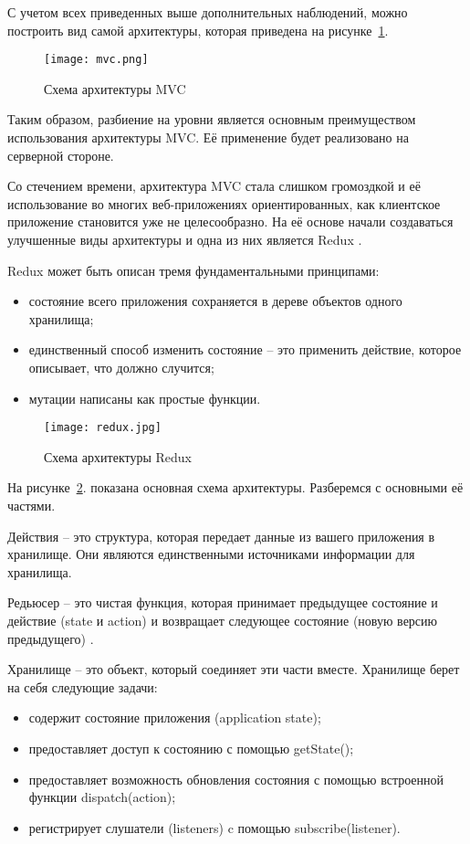 С учетом всех приведенных выше дополнительных наблюдений, можно построить вид самой архитектуры, которая приведена на рисунке~\ref{fig:domain:manual_structure:credit_net}.

\begin{figure}[ht]
\centering
  \texttt{[image: mvc.png]}  
  \caption{ 
  Схема архитектуры MVC }
  \label{fig:domain:manual_structure:credit_net}
\end{figure}

Таким образом, разбиение на уровни является основным преимуществом использования архитектуры MVC. Её применение будет реализовано на серверной стороне.

Со стечением времени, архитектура MVC стала слишком громоздкой и её использование во многих веб-приложениях ориентированных, как клиентское приложение становится уже не целесообразно. На её основе начали создаваться улучшенные виды архитектуры и одна из них является Redux \cite{redux}.

Redux может быть описан тремя фундаментальными принципами:
 
\begin{itemize}
  \item состояние всего приложения сохраняется в дереве объектов одного хранилища;
  \item единственный способ изменить состояние -- это применить действие, которое описывает, что должно случится;
  \item мутации написаны как простые функции.
\end{itemize}

\begin{figure}[ht]
\centering
  \texttt{[image: redux.jpg]}  
  \caption{ Схема архитектуры Redux }
  \label{fig:domain:manual_structure:credit_redux}
\end{figure}

На рисунке~\ref{fig:domain:manual_structure:credit_redux}. показана основная схема архитектуры. Разберемся с основными её частями.

Действия -- это структура, которая передает данные из вашего приложения в хранилище. Они являются единственными источниками информации для хранилища.

Редьюсер -- это чистая функция, которая принимает предыдущее состояние и действие (state и action) и возвращает следующее состояние (новую версию предыдущего) \cite{redux_framework}.

Хранилище -- это объект, который соединяет эти части вместе. Хранилище берет на себя следующие задачи:
\begin{itemize}
  \item содержит состояние приложения (application state);
  \item предоставляет доступ к состоянию с помощью getState();
  \item предоставляет возможность обновления состояния с помощью встроенной функции dispatch(action);
  \item регистрирует слушатели (listeners) c помощью subscribe(listener).
\end{itemize}

